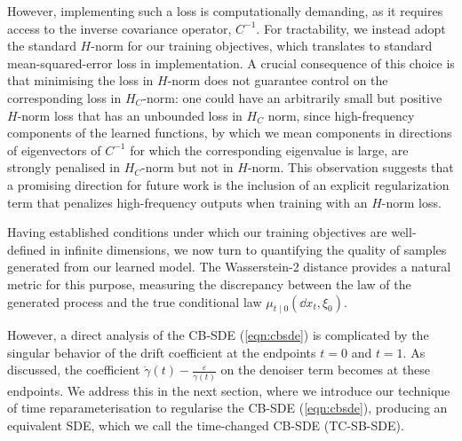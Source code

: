 However, implementing such a loss is computationally demanding, as it requires access to the inverse covariance operator, \(C^{-1}\). For tractability, we instead adopt the standard \(H\)-norm for our training objectives, which translates to standard mean-squared-error loss in implementation. A crucial consequence of this choice is that minimising the loss in \(H\)-norm does not guarantee control on the corresponding loss in \(H_{C}\)-norm: one could have an arbitrarily small but positive \(H\)-norm loss that has an unbounded loss in \(H_{C}\) norm, since  high-frequency components of the learned functions, by which we mean components in directions of eigenvectors of \(C^{-1}\) for which the corresponding eigenvalue is large, are strongly penalised in \(H_{C}\)-norm  but not in \(H\)-norm. This observation suggests that a promising direction for future work is the inclusion of an explicit regularization term that penalizes high-frequency outputs when training with an \(H\)-norm loss.

Having established conditions under which our training objectives are well-defined in infinite dimensions, we now turn to quantifying the quality of samples generated from our learned model. The Wasserstein-2 distance provides a natural metric for this purpose, measuring the discrepancy between the law of the generated process and the true conditional law \(\mu_{t \mid 0}(\dd{x_{t}, \xi_{0}})\).

However, a direct analysis of the CB-SDE (\ref{eqn:cbsde}) is complicated by the singular behavior of the drift coefficient at the endpoints \(t=0\) and \(t=1\). As discussed, the coefficient \(\dot{\gamma}(t) - \frac{\varepsilon}{\gamma(t)}\) on the denoiser term becomes at these endpoints. We address this in the next section, where we introduce our technique of time reparameterisation to regularise the CB-SDE (\ref{eqn:cbsde}), producing an equivalent SDE, which we call the time-changed CB-SDE (TC-SB-SDE).


